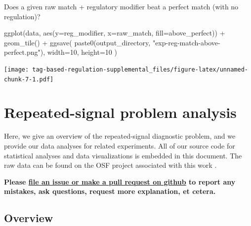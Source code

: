 \documentclass[
]{book}
\newenvironment{Shaded}{\begin{snugshade}}{\end{snugshade}}
\newcommand{\AttributeTok}[1]{\textcolor[rgb]{0.77,0.63,0.00}{#1}}
\newcommand{\DecValTok}[1]{\textcolor[rgb]{0.00,0.00,0.81}{#1}}
\newcommand{\FunctionTok}[1]{\textcolor[rgb]{0.00,0.00,0.00}{#1}}
\newcommand{\NormalTok}[1]{#1}
\newcommand{\SpecialCharTok}[1]{\textcolor[rgb]{0.00,0.00,0.00}{#1}}
\newcommand{\StringTok}[1]{\textcolor[rgb]{0.31,0.60,0.02}{#1}}
\begin{document}
Does a given raw match + regulatory modifier beat a perfect match (with no regulation)?

\begin{Shaded}
\begin{Highlighting}[]
\FunctionTok{ggplot}\NormalTok{(data, }\FunctionTok{aes}\NormalTok{(}\AttributeTok{y=}\NormalTok{reg\_modifier, }\AttributeTok{x=}\NormalTok{raw\_match, }\AttributeTok{fill=}\NormalTok{above\_perfect)) }\SpecialCharTok{+}
  \FunctionTok{geom\_tile}\NormalTok{() }\SpecialCharTok{+}
  \FunctionTok{ggsave}\NormalTok{(}
    \FunctionTok{paste0}\NormalTok{(output\_directory, }\StringTok{"exp{-}reg{-}match{-}above{-}perfect.png"}\NormalTok{),}
    \AttributeTok{width=}\DecValTok{10}\NormalTok{,}
    \AttributeTok{height=}\DecValTok{10}
\NormalTok{  )}
\end{Highlighting}
\end{Shaded}

\texttt{[image: tag-based-regulation-supplemental\_files/figure-latex/unnamed-chunk-7-1.pdf]}

\hypertarget{repeated-signal-problem-analysis}{%
\chapter{Repeated-signal problem analysis}\label{repeated-signal-problem-analysis}}

Here, we give an overview of the repeated-signal diagnostic problem, and we provide our data analyses for related experiments.
All of our source code for statistical analyses and data visualizations is embedded in this document.
The raw data can be found on the OSF project associated with this work \citep{Lalejini_Moreno_Ofria_Data_2020}.

\textbf{Please \href{https://github.com/amlalejini/Tag-based-Genetic-Regulation-for-LinearGP/issues}{file an issue or make a pull request on github} to report any mistakes, ask questions, request more explanation, et cetera.}

\hypertarget{overview}{%
\section{Overview}\label{overview}}
\end{document}
